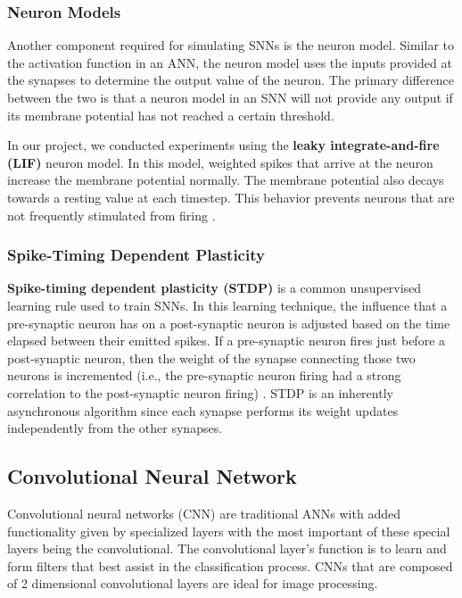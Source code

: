 \documentclass[journal]{IEEEtran}
\begin{document}


\subsubsection{Neuron Models}

Another component required for simulating SNNs is the neuron model. Similar to the activation function in an ANN, the neuron model uses the inputs provided at the synapses to determine the output value of the neuron. The primary difference between the two is that a neuron model in an SNN will not provide any output if its membrane potential has not reached a certain threshold.


In our project, we conducted experiments using the \textbf{leaky integrate-and-fire (LIF)} neuron model. In this model, weighted spikes that arrive at the neuron increase the membrane potential normally. The membrane potential also decays towards a resting value at each timestep. This behavior prevents neurons that are not frequently stimulated from firing \cite{burkitt2006review}.

% 
\subsubsection{Spike-Timing Dependent Plasticity}

\textbf{Spike-timing dependent plasticity (STDP)} is a common unsupervised learning rule used to train SNNs. In this learning technique, the influence that a pre-synaptic neuron has on a post-synaptic neuron is adjusted based on the time elapsed between their emitted spikes. If a pre-synaptic neuron fires just before a post-synaptic neuron, then the weight of the synapse connecting those two neurons is incremented (i.e., the pre-synaptic neuron firing had a strong correlation to the post-synaptic neuron firing) \cite{Sjostrom:2010}. STDP is an inherently asynchronous algorithm since each synapse performs its weight updates independently from the other synapses.

\subsection{Convolutional Neural Network}
Convolutional neural networks (CNN) are traditional ANNs with added functionality given by specialized layers with the most important of these special layers being the convolutional. The convolutional layer's function is to learn and form filters that best assist in the classification process. CNNs that are composed of 2 dimensional convolutional layers are ideal for image processing.
\end{document}
